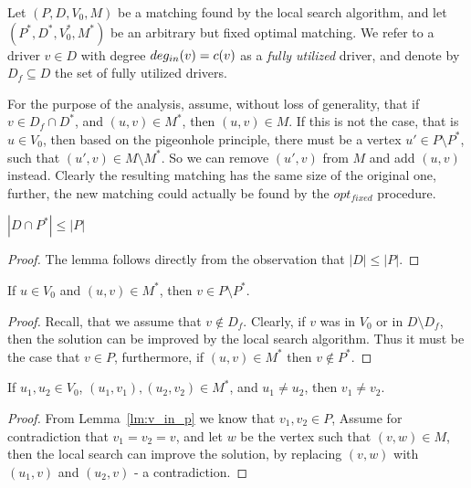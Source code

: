 Let $(P, D, V_0, M)$ be a matching found by the local search algorithm, and let
$(P^*, D^*, V^*_0, M^*)$ be an arbitrary but fixed optimal matching.
We refer to a driver $v \in D$ with degree $deg_{in}(v) = c(v)$ as a \emph{fully utilized}
driver, and denote by $D_f \subseteq D$ the set of fully utilized drivers.

For the purpose of the analysis, assume, without loss of generality, that
if $v \in D_f \cap D^*$, and $(u, v) \in M^*$, then $(u, v) \in M$.
If this is not the case, that is $u \in V_0$, then based on the pigeonhole principle,
there must be a vertex $u' \in P \setminus P^*$, such that $(u', v) \in M \setminus M^*$.
So we can remove $(u', v)$ from $M$ and add $(u, v)$ instead.
Clearly the resulting matching has the same size of the original one,
further, the new matching could actually be found by the $opt_{fixed}$ procedure.


\begin{lemma}
\label{lm:dleqp}
$|D \cap P^*| \leq |P|$
\end{lemma}

\begin{proof}
The lemma follows directly from the observation that 
${|D| \leq |P|}$.
\end{proof}

\begin{lemma}
\label{lm:v_in_p}
If $u \in V_0$ and $(u, v) \in M^*$, then $v \in P \setminus P^*$.
\end{lemma}

\begin{proof}
Recall, that we assume that $v \notin D_f$.
Clearly, if $v$ was in $V_0$ or in $D \setminus D_f$, 
then the solution can be improved by the local search algorithm.
Thus it must be the case that $v \in P$, furthermore, 
if $(u, v) \in M^*$ then $v \notin P^*$. 
\end{proof}

\begin{lemma}
\label{lm:u1nequ2thenv1neqv2}
If $u_1, u_2 \in V_0$, 
$(u_1, v_1), (u_2, v_2) \in M^*$, 
and $u_1 \neq u_2$,
then $v_1 \neq v_2$.
\end{lemma}

\begin{proof}
From Lemma~\ref{lm:v_in_p} we know that $v_1, v_2 \in P$,
Assume for contradiction that $v_1 = v_2 = v$,
and let $w$ be the vertex such that $(v, w) \in M$,
then the local search can improve the solution, 
by replacing $(v, w)$ with $(u_1, v)$ and $(u_2, v)$ - a contradiction.
\end{proof}

